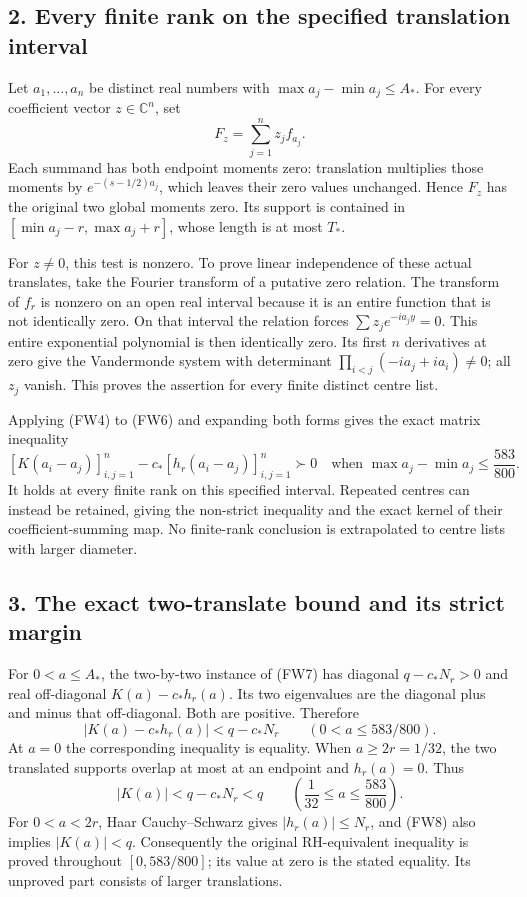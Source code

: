 \documentclass[
  10pt,
  a4paper,
]{article}
\begin{document}
\subsection{2. Every finite rank on the specified translation
interval}\label{every-finite-rank-on-the-specified-translation-interval}

Let \(a_1,\ldots,a_n\) be distinct real numbers with
\(\max a_j-\min a_j\le A_*\). For every coefficient vector
\(z\in\mathbb C^n\), set \[
F_z=\sum_{j=1}^n z_j f_{a_j}.
\tag{FW6}
\] Each summand has both endpoint moments zero: translation multiplies
those moments by \(e^{-(s-1/2)a_j}\), which leaves their zero values
unchanged. Hence \(F_z\) has the original two global moments zero. Its
support is contained in \([\min a_j-r,\max a_j+r]\), whose length is at
most \(T_*\).

For \(z\ne0\), this test is nonzero. To prove linear independence of
these actual translates, take the Fourier transform of a putative zero
relation. The transform of \(f_r\) is nonzero on an open real interval
because it is an entire function that is not identically zero. On that
interval the relation forces \(\sum z_j e^{-i a_j y}=0\). This entire
exponential polynomial is then identically zero. Its first \(n\)
derivatives at zero give the Vandermonde system with determinant
\(\prod_{i<j}(-ia_j+ia_i)\ne0\); all \(z_j\) vanish. This proves the
assertion for every finite distinct centre list.

Applying (FW4) to (FW6) and expanding both forms gives the exact matrix
inequality \[
\boxed{
[K(a_i-a_j)]_{i,j=1}^n
-c_*[h_r(a_i-a_j)]_{i,j=1}^n\succ0
\quad\text{when }\max a_j-\min a_j\le\frac{583}{800}.}
\tag{FW7}
\] It holds at every finite rank on this specified interval. Repeated
centres can instead be retained, giving the non-strict inequality and
the exact kernel of their coefficient-summing map. No finite-rank
conclusion is extrapolated to centre lists with larger diameter.

\subsection{3. The exact two-translate bound and its strict
margin}\label{the-exact-two-translate-bound-and-its-strict-margin}

For \(0<a\le A_*\), the two-by-two instance of (FW7) has diagonal
\(q-c_*N_r>0\) and real off-diagonal \(K(a)-c_*h_r(a)\). Its two
eigenvalues are the diagonal plus and minus that off-diagonal. Both are
positive. Therefore \[
\boxed{|K(a)-c_*h_r(a)|<q-c_*N_r\qquad(0<a\le583/800).}
\tag{FW8}
\] At \(a=0\) the corresponding inequality is equality. When
\(a\ge2r=1/32\), the two translated supports overlap at most at an
endpoint and \(h_r(a)=0\). Thus \[
\boxed{|K(a)|<q-c_*N_r<q
\qquad\left(\frac1{32}\le a\le\frac{583}{800}\right).}
\tag{FW9}
\] For \(0<a<2r\), Haar Cauchy--Schwarz gives \(|h_r(a)|\le N_r\), and
(FW8) also implies \(|K(a)|<q\). Consequently the original RH-equivalent
inequality is proved throughout \([0,583/800]\); its value at zero is
the stated equality. Its unproved part consists of larger translations.
\end{document}
